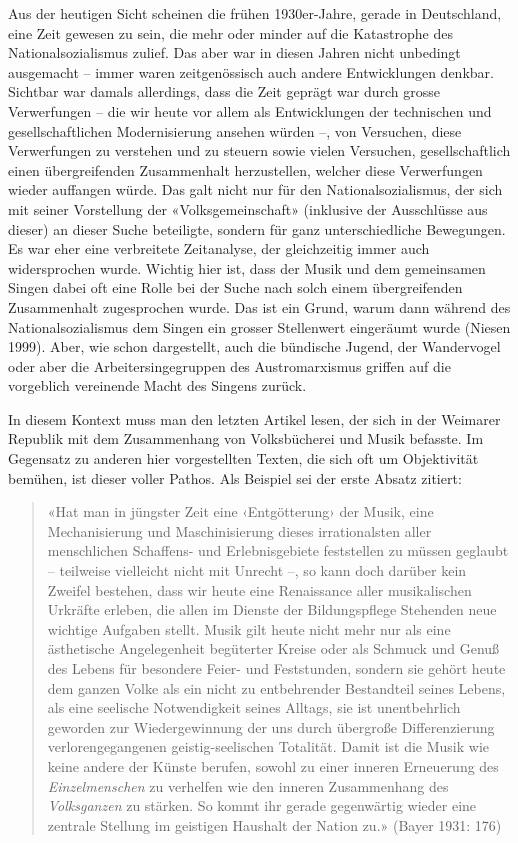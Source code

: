 \documentclass[a4paper,
fontsize=11pt,
oneside,
numbers=noperiodatend,
parskip=half-,
bibliography=totoc,
final
]{scrartcl}
\begin{document}
Aus der heutigen Sicht scheinen die frühen 1930er-Jahre, gerade in
Deutschland, eine Zeit gewesen zu sein, die mehr oder minder auf die
Katastrophe des Nationalsozialismus zulief. Das aber war in diesen
Jahren nicht unbedingt ausgemacht -- immer waren zeitgenössisch auch
andere Entwicklungen denkbar. Sichtbar war damals allerdings, dass die
Zeit geprägt war durch grosse Verwerfungen -- die wir heute vor allem
als Entwicklungen der technischen und gesellschaftlichen Modernisierung
ansehen würden --, von Versuchen, diese Verwerfungen zu verstehen und zu
steuern sowie vielen Versuchen, gesellschaftlich einen übergreifenden
Zusammenhalt herzustellen, welcher diese Verwerfungen wieder auffangen
würde. Das galt nicht nur für den Nationalsozialismus, der sich mit
seiner Vorstellung der «Volksgemeinschaft» (inklusive der Ausschlüsse
aus dieser) an dieser Suche beteiligte, sondern für ganz
unterschiedliche Bewegungen. Es war eher eine verbreitete Zeitanalyse,
der gleichzeitig immer auch widersprochen wurde. Wichtig hier ist, dass
der Musik und dem gemeinsamen Singen dabei oft eine Rolle bei der Suche
nach solch einem übergreifenden Zusammenhalt zugesprochen wurde. Das ist
ein Grund, warum dann während des Nationalsozialismus dem Singen ein
grosser Stellenwert eingeräumt wurde (Niesen 1999). Aber, wie schon
dargestellt, auch die bündische Jugend, der Wandervogel oder aber die
Arbeitersingegruppen des Austromarxismus griffen auf die vorgeblich
vereinende Macht des Singens zurück.

In diesem Kontext muss man den letzten Artikel lesen, der sich in der
Weimarer Republik mit dem Zusammenhang von Volksbücherei und Musik
befasste. Im Gegensatz zu anderen hier vorgestellten Texten, die sich
oft um Objektivität bemühen, ist dieser voller Pathos. Als Beispiel sei
der erste Absatz zitiert:

\begin{quote}
«Hat man in jüngster Zeit eine ‹Entgötterung› der Musik, eine
Mechanisierung und Maschinisierung dieses irrationalsten aller
menschlichen Schaffens- und Erlebnisgebiete feststellen zu müssen
geglaubt -- teilweise vielleicht nicht mit Unrecht --, so kann doch
darüber kein Zweifel bestehen, dass wir heute eine Renaissance aller
musikalischen Urkräfte erleben, die allen im Dienste der Bildungspflege
Stehenden neue wichtige Aufgaben stellt. Musik gilt heute nicht mehr nur
als eine ästhetische Angelegenheit begüterter Kreise oder als Schmuck
und Genuß des Lebens für besondere Feier- und Feststunden, sondern sie
gehört heute dem ganzen Volke als ein nicht zu entbehrender Bestandteil
seines Lebens, als eine seelische Notwendigkeit seines Alltags, sie ist
unentbehrlich geworden zur Wiedergewinnung der uns durch übergroße
Differenzierung verlorengegangenen geistig-seelischen Totalität. Damit
ist die Musik wie keine andere der Künste berufen, sowohl zu einer
inneren Erneuerung des \emph{Einzelmenschen} zu verhelfen wie den
inneren Zusammenhang des \emph{Volksganzen} zu stärken. So kommt ihr
gerade gegenwärtig wieder eine zentrale Stellung im geistigen Haushalt
der Nation zu.» (Bayer 1931: 176)
\end{quote}
\end{document}
